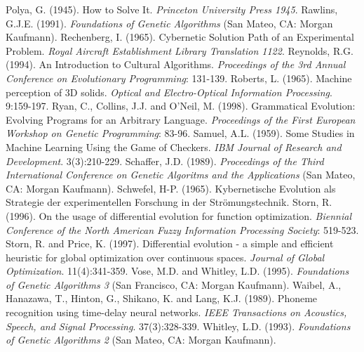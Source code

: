 \documentclass[spanish,a4paper,12pt,twoside]{report}
\begin{document}
\begin{thebibliography}{00}
   Polya, G. (1945). How to Solve It. \emph{Princeton University Press 1945}.
   Rawlins, G.J.E. (1991). \emph{Foundations of Genetic Algorithms} (San Mateo, CA: Morgan Kaufmann).
   Rechenberg, I. (1965). Cybernetic Solution Path of an Experimental Problem. \emph{Royal Aircraft Establishment Library Translation 1122}.
   Reynolds, R.G. (1994). An Introduction to Cultural Algorithms. \emph{Proceedings of the 3rd Annual Conference on Evolutionary Programming}: 131-139.
   Roberts, L. (1965). Machine perception of 3D solids. \emph{Optical and Electro-Optical Information Processing}. 9:159-197.
   Ryan, C., Collins, J.J. and O'Neil, M. (1998). Grammatical Evolution: Evolving Programs for an Arbitrary Language. \emph{Proceedings of the First European Workshop on Genetic Programming}: 83-96.
   Samuel, A.L. (1959). Some Studies in Machine Learning Using the Game of Checkers. \emph{IBM Journal of Research and Development}. 3(3):210-229.
   Schaffer, J.D. (1989). \emph{Proceedings of the Third International Conference on Genetic Algoritms and the Applications} (San Mateo, CA: Morgan Kaufmann).
   Schwefel, H-P. (1965). Kybernetische Evolution als Strategie der experimentellen Forschung in der Strömungstechnik.
   Storn, R. (1996). On the usage of differential evolution for function optimization. \emph{Biennial Conference of the North American Fuzzy Information Processing Society}: 519-523.
   Storn, R. and Price, K. (1997). Differential evolution - a simple and efficient heuristic for global optimization over continuous spaces. \emph{Journal of Global Optimization}. 11(4):341-359.
   Vose, M.D. and Whitley, L.D. (1995). \emph{Foundations of Genetic Algorithms 3} (San Francisco, CA: Morgan Kaufmann).
   Waibel, A., Hanazawa, T., Hinton, G., Shikano, K. and Lang, K.J. (1989). Phoneme recognition using time-delay neural networks. \emph{IEEE Transactions on Acoustics, Speech, and Signal Processing}. 37(3):328-339.
   Whitley, L.D. (1993). \emph{Foundations of Genetic Algorithms 2} (San Mateo, CA: Morgan Kaufmann).
  \end{thebibliography}
  
\end{document}
